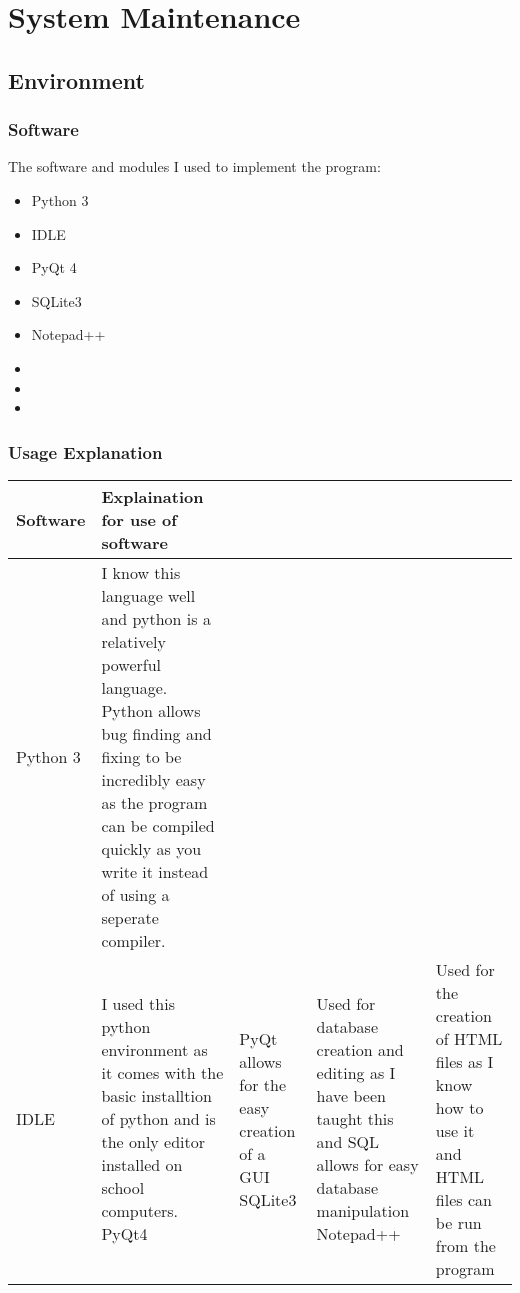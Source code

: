 \chapter{System Maintenance}

\section{Environment}

\subsection{Software}
The software and modules I used to implement the program:
\begin{itemize}
	\item Python 3
	\item IDLE
	\item PyQt 4
	\item SQLite3
	\item Notepad++
	\item 
	\item 
	\item 
\end{itemize}

\subsection{Usage Explanation}
\begin{center}
	\begin{tabular}{|p{2cm}|p{2cm}|p{2cm}|p{2cm}|l}
		\hline
		\textbf{Software}   & \textbf{Explaination for use of software} \\ \hline
		Python 3 & I know this language well and python is a relatively powerful language. Python allows bug finding and fixing to be incredibly easy as the program can be compiled quickly as you write it instead of using a seperate compiler. \\ \hline
		IDLE &  I used this python environment as it comes with the basic installtion of python and is the only editor installed on school computers.
		PyQt4 & PyQt allows for the easy creation of a GUI
		SQLite3 & Used for database creation and editing as I have been taught this and SQL allows for easy database manipulation
		Notepad++ & Used for the creation of HTML files as I know how to use it and HTML files can be run from the program
\end{tabular}
\end{center}


